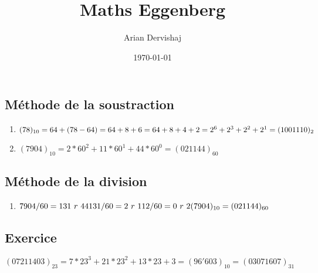 \documentclass[a4paper, 12pt]{article}
\title{Maths Eggenberg}
\author{Arian Dervishaj}
\date{\today}
\begin{document}
\maketitle
\pagebreak

\subsection*{Méthode de la soustraction}

\begin{enumerate}
    \item   $(78)_{10}= 64 + (78-64) = 64 + 8 + 6 = 64 + 8 + 4 + 2 = \\
            2^{6} + 2^{3} + 2^{2} + 2^{1} = (1001110)_2$
    \item   $(7904)_{10} = 2 * 60^{2} + 11 * 60^{1} + 44 * 60^{0} = (021144)_{60}$
\end{enumerate}

\subsection*{Méthode de la division}

\begin{enumerate}
    \item   $7904 / 60 = 131\  r\ 44 \\
            131 / 60 = 2\ r\ 11 \\ 
            2 / 60 = 0\ r\ 2 \\ 
            (7904)_{10} = (021144)_{60}$
\end{enumerate}

\subsection*{Exercice}
    $(07211403)_{23} = 7 * 23^{3} + 21 * 23^{2} + 13*23 + 3 = (96'603)_{10} = (03071607)_{31}$
\end{document}
